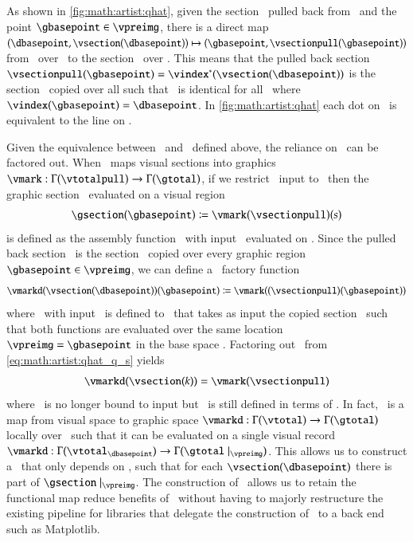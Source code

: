 \documentclass[journal]{vgtc}                %
\begin{document}
As shown in \autoref{fig:math:artist:qhat}, given the section \vsectionpull\ pulled back from \vsection\ and the point $\gbasepoint \in \vpreimg$, there is a direct map $(\dbasepoint, \vsection(\dbasepoint)) \mapsto (\gbasepoint, \vsectionpull(\gbasepoint))$  from \vsection\ over \dbasepoint\ to the section \vsectionpull\ over \gbasepoint. This means that the pulled back section $\vsectionpull(\gbasepoint) = \vindex^*(\vsection(\dbasepoint))$ is the section \vsection\ copied over all \gbasepoint such that \vsectionpull\ is identical for all \gbasepoint\ where $\vindex(\gbasepoint) = \dbasepoint$. In \autoref{fig:math:artist:qhat} each dot on \vfiber\ is equivalent to the line on \vfiberpull. 

Given the equivalence between \vsection\ and \vsectionpull\ defined above, the reliance on \gbase\ can be factored out. When \vmark\ maps visual sections into graphics $\vmark: \Gamma(\vtotalpull) \rightarrow \Gamma(\gtotal)$, if we restrict \vmark\ input to \vsectionpull\ then the graphic section \gsection\ evaluated on a visual region \gbasepoint\
\begin{equation}
    \gsection(\gbasepoint) \coloneqq \vmark(\vsectionpull)(s)
    \label{eq:math:artist:qhat}
\end{equation}
 is defined as the assembly function \vmark\ with input \vsectionpull\ evaluated on \gbasepoint. Since the pulled back section \vsectionpull\ is the section \vsection\ copied over every graphic region $\gbasepoint \in \vpreimg$, we can define a \vmark\ factory function 
\begin{equation}
\label{eq:math:artist:qhat_q_s}
\vmarkd(\vsection(\dbasepoint))(\gbasepoint) \coloneqq \vmark((\vsectionpull)(\gbasepoint))
\end{equation} 
where \vmarkd\ with input \vsection\ is defined to \vmark\ that takes as input the copied section \vsectionpull\ such that both functions are evaluated over the same location $\vpreimg = \gbasepoint$ in the base space \gbase. Factoring out \gbasepoint\ from \autoref{eq:math:artist:qhat_q_s} yields
\begin{equation}
\vmarkd(\vsection(k)) = \vmark(\vsectionpull)
\label{eq:math:artist:qhat_k}
\end{equation}
where \vmark\ is no longer bound to input but \vmarkd\ is still defined in terms of \dbase. In fact, \vmarkd\ is a map from visual space to graphic space $\vmarkd:\Gamma(\vtotal) \rightarrow \Gamma(\gtotal)$ locally over \dbasepoint\ such that it can be evaluated on a single visual record  $\vmarkd:\Gamma(\vtotal_{\dbasepoint}) \rightarrow \Gamma(\gtotal\mid_{\vpreimg})$. This allows us to construct a \vmarkd\ that only depends on \dbase, such that for each $\vsection(\dbasepoint)$ there is part of $\gsection\mid_{\vpreimg}$. The construction of \vmarkd\ allows us to retain the functional map reduce benefits of \vmark\ without having to majorly restructure the existing pipeline for libraries that delegate the construction of \gsection\ to a back end such as Matplotlib.
\end{document}
